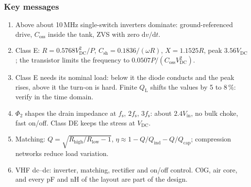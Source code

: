 \begin{frame}
	\frametitle{Key messages}
	\begin{enumerate}
		\item Above about 10\,MHz single-switch inverters dominate: ground-referenced drive, $C_\mathrm{oss}$ inside the tank, ZVS with zero $\mathrm{d}v/\mathrm{d}t$.
		\item Class E: $R=0.5768V_\mathrm{DC}^2/P$, $C_\mathrm{sh}=0.1836/(\omega R)$, $X=1.1525R$, peak $3.56V_\mathrm{DC}$; the transistor limits the frequency to $0.0507P/(C_\mathrm{oss}V_\mathrm{DC}^2)$.
		\item Class E needs its nominal load: below it the diode conducts and the peak rises, above it the turn-on is hard. Finite $Q_\mathrm{L}$ shifts the values by 5 to 8\,\%: verify in the time domain.
		\item $\Phi_2$ shapes the drain impedance at $f_\mathrm{s}$, $2f_\mathrm{s}$, $3f_\mathrm{s}$: about $2.4V_\mathrm{in}$, no bulk choke, fast on/off. Class DE keeps the stress at $V_\mathrm{DC}$.
		\item Matching: $Q=\sqrt{R_\mathrm{high}/R_\mathrm{low}-1}$, $\eta\approx1-Q/Q_\mathrm{ind}-Q/Q_\mathrm{cap}$; compression networks reduce load variation.
		\item VHF dc--dc: inverter, matching, rectifier and on/off control. C0G, air core, and every pF and nH of the layout are part of the design.
	\end{enumerate}
\end{frame}

